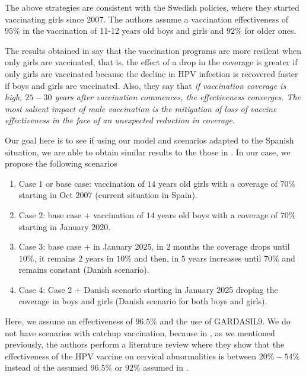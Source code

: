 The above strategies are consistent with the Swedish policies, where they started vaccinating girls since 2007. The authors assume a vaccination effectiveness of $95\%$ in the vaccination of 11-12 years old boys and girls and $92\%$ for older ones.

The results obtained in \cite{Elfstrm2015} say that the vaccination programs are more resilent when only girls are vaccinated, that is, the effect of a drop in the coverage is greater if only girls are vaccinated because the decline in HPV infection is recovered faster if boys and girls are vaccinated. Also, they say that \textit{if vaccination coverage is high, $25-30$ years after vaccination commences, the effectiveness converges. The most salient impact of male vaccination is the mitigation of loss of vaccine effectiveness in the face of an unexpected reduction in coverage}.

Our goal here is to see if using our model and scenarios adapted to the Spanish situation, we are able to obtain similar results to the those in \cite{Elfstrm2015}. In our case, we propose the following scenarios

\begin{enumerate}
	\item Case 1 or base case: vaccination of $14$ years old girls with a coverage of $70\%$ starting in Oct $2007$ (current situation in Spain).
	\item Case 2: base case $+$ vaccination of $14$ years old boys with a coverage of $70\%$ starting in January $2020$.
	\item Case 3: base case $+$ in January $2025$, in $2$ months the coverage drops until $10\%$, it remains $2$ years in $10\%$ and then, in $5$ years increases until $70\%$ and remains constant (Danish scenario).
	\item Case 4: Case 2 $+$ Danish scenario starting in January 2025 droping the coverage in boys and girls (Danish scenario for both boys and girls).
\end{enumerate}

Here, we assume an effectiveness of $96.5\%$ and the use of GARDASIL9. We do not have scenarios with catchup vaccination, because in \cite{Skufca}, as we mentioned previously, the authors perform a literature review where they show that the effectiveness of the HPV vaccine on cervical abnormalities is between $20\% - 54\%$ instead of the assumed $96.5\%$ or $92\%$ assumed in \cite{Elfstrm2015}. 


